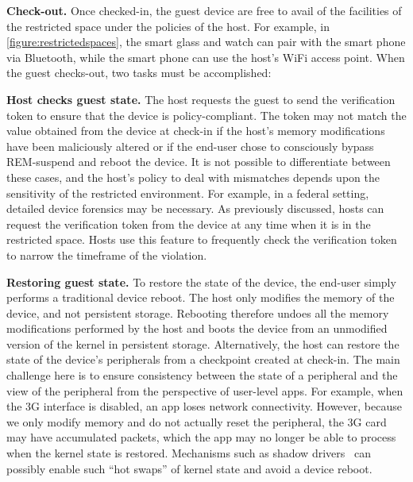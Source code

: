 \documentclass[pageno]{sig-alternate-05-2015}
\newcommand{\figref}[1]{\autoref{#1}}
\newcommand{\myparagraph}[1]{\indent\par\noindent\textsf{\textbf{#1.}}}
\newcommand{\emphitem}[1]{\textbf{#1}}
\newcommand*\circled[1]{\tikz[baseline=(char.base)]{
            \node[shape=circle,draw,inner sep=0.5pt] (char) {#1};}}
\newcounter{myctr}
\newenvironment{mylist}{\begin{list}{\textbf{\circled{\arabic{myctr}}}}
{\usecounter{myctr}
\setlength{\topsep}{1mm}\setlength{\itemsep}{0.5mm}
\setlength{\parsep}{0.5mm}
\setlength{\listparindent}{\parindent} %
\setlength{\itemindent}{0mm}\setlength{\partopsep}{0mm}
\setlength{\labelwidth}{-2mm}
\setlength{\leftmargin}{0mm}}}{\end{list}}
\begin{document}
\myparagraph{Check-out} Once checked-in, the guest device are free to avail of
the facilities of the restricted space under the policies of the host. For
example, in \figref{figure:restrictedspaces}, the smart glass and watch can
pair with the smart phone via Bluetooth, while the smart phone can use the
host's WiFi access point. When the guest checks-out, two tasks must be
accomplished:
%
\begin{mylist}
%
\item \emphitem{Host checks guest state.} The host requests the guest to send
the verification token to ensure that the device is policy-compliant. The token
may not match the value obtained from the device at check-in if the host's
memory modifications have been maliciously altered or if the end-user chose to
consciously bypass REM-suspend and reboot the device.  It is not possible to
differentiate between these cases, and the host's policy to deal with
mismatches depends upon the sensitivity of the restricted environment. For
example, in a federal setting, detailed device forensics may be necessary. As
previously discussed, hosts can request the verification token from the device
at any time when it is in the restricted space. Hosts use this feature to
frequently check the verification token to narrow the timeframe of the
violation.

\item \emphitem{Restoring guest state.} To restore the state of the device, the
end-user simply performs a traditional device reboot. The host only modifies
the memory of the device, and not persistent storage. Rebooting therefore
undoes all the memory modifications performed by the host and boots the device
from an unmodified version of the kernel in persistent storage. Alternatively,
the host can restore the state of the device's peripherals from a checkpoint
created at check-in. The main challenge here is to ensure consistency between
the state of a peripheral and the view of the peripheral from the perspective
of user-level apps. For example, when the 3G interface is disabled, an app
loses network connectivity. However, because we only modify memory and do not
actually reset the peripheral, the 3G card may have accumulated packets, which
the app may no longer be able to process when the kernel state is restored.
Mechanisms such as shadow drivers~\cite{shadow:tocs06} can possibly enable 
such ``hot swaps'' of kernel state and avoid a device reboot.
%
\end{mylist}
\end{document}
